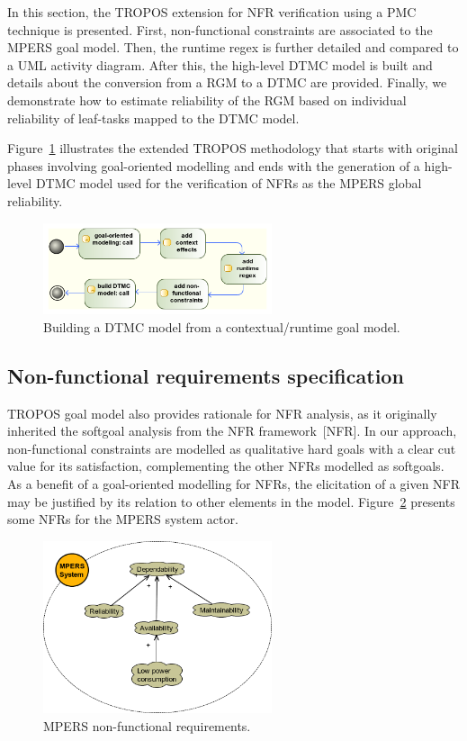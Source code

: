 In this section, the TROPOS extension for NFR verification using a PMC technique is presented. First, non-functional constraints are associated to the MPERS goal model. Then, the runtime regex is further detailed and compared to a UML activity diagram. After this, the high-level DTMC model is built and details about the conversion from a RGM to a DTMC are provided. Finally, we demonstrate how to estimate reliability of the RGM based on individual reliability of leaf-tasks mapped to the DTMC model.

Figure~\ref{fig:CRGM_TO_DTMC} illustrates the extended TROPOS methodology that starts with original phases involving goal-oriented modelling and ends with the generation of a high-level DTMC model used for the verification of NFRs as the MPERS global reliability.

\begin{figure}[h!]
\centering
\includegraphics[width=0.60\textwidth]{imgs/CRGM_TO_DTMC.png}
\caption{Building a DTMC model from a contextual/runtime goal model.}
\label{fig:CRGM_TO_DTMC}
\end{figure}

\subsection{Non-functional requirements specification}

TROPOS goal model also provides rationale for NFR analysis, as it originally inherited the softgoal analysis from the NFR framework~[NFR]. In our approach, non-functional constraints are modelled as qualitative hard goals with a clear cut value for its satisfaction, complementing the other NFRs modelled as softgoals. As a benefit of a goal-oriented modelling for NFRs, the elicitation of a given NFR may be justified by its relation to other elements in the model. Figure~\ref{fig:MPERS_NFR} presents some NFRs for the MPERS system actor.

\begin{figure}[h!]
\centering
\includegraphics[width=0.6\textwidth]{imgs/MPERS_NFR.png}
\caption{MPERS non-functional requirements.}
\label{fig:MPERS_NFR}
\end{figure}

